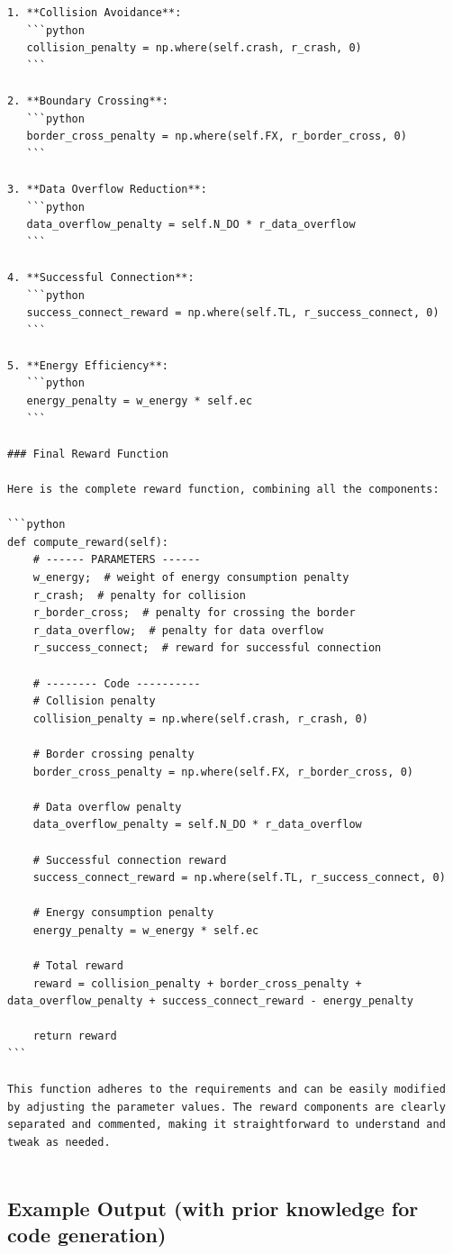 \documentclass{article}
\begin{document}
\begin{verbatim}
1. **Collision Avoidance**:
   ```python
   collision_penalty = np.where(self.crash, r_crash, 0)
   ```

2. **Boundary Crossing**:
   ```python
   border_cross_penalty = np.where(self.FX, r_border_cross, 0)
   ```

3. **Data Overflow Reduction**:
   ```python
   data_overflow_penalty = self.N_DO * r_data_overflow
   ```

4. **Successful Connection**:
   ```python
   success_connect_reward = np.where(self.TL, r_success_connect, 0)
   ```

5. **Energy Efficiency**:
   ```python
   energy_penalty = w_energy * self.ec
   ```

### Final Reward Function

Here is the complete reward function, combining all the components:

```python
def compute_reward(self):
    # ------ PARAMETERS ------
    w_energy;  # weight of energy consumption penalty
    r_crash;  # penalty for collision
    r_border_cross;  # penalty for crossing the border
    r_data_overflow;  # penalty for data overflow
    r_success_connect;  # reward for successful connection

    # -------- Code ----------
    # Collision penalty
    collision_penalty = np.where(self.crash, r_crash, 0)
    
    # Border crossing penalty
    border_cross_penalty = np.where(self.FX, r_border_cross, 0)
    
    # Data overflow penalty
    data_overflow_penalty = self.N_DO * r_data_overflow
    
    # Successful connection reward
    success_connect_reward = np.where(self.TL, r_success_connect, 0)
    
    # Energy consumption penalty
    energy_penalty = w_energy * self.ec
    
    # Total reward
    reward = collision_penalty + border_cross_penalty + data_overflow_penalty + success_connect_reward - energy_penalty
    
    return reward
```

This function adheres to the requirements and can be easily modified by adjusting the parameter values. The reward components are clearly separated and commented, making it straightforward to understand and tweak as needed.


\end{verbatim}

\subsection{Example Output (with prior knowledge for code generation)}
\end{document}
